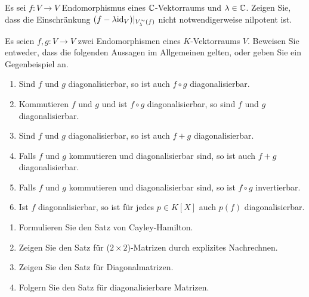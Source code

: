 \documentclass[a4paper,10pt]{scrartcl}
\begin{document}
\begin{question}
  Es sei $f \colon V \to V$ Endomorphismus eines $\mathbb{C}$-Vektorraums und $\lambda \in \mathbb{C}$.
  Zeigen Sie, dass die Einschränkung $(f - \lambda {\operatorname{id}_V})|_{V^\sim_\lambda(f)}$ nicht notwendigerweise nilpotent ist.
\end{question}


\begin{question}
  Es seien $f, g \colon V \to V$ zwei Endomorphismen eines $K$-Vektorraums $V$.
  Beweisen Sie entweder, dass die folgenden Aussagen im Allgemeinen gelten, oder geben Sie ein Gegenbeispiel an.
  \begin{enumerate}[leftmargin=*]
    \item
      Sind $f$ und $g$ diagonalisierbar, so ist auch $f \circ g$ diagonalisierbar.
    \item
      Kommutieren $f$ und $g$ und ist $f \circ g$ diagonalisierbar, so sind $f$ und $g$ diagonalisierbar.
    \item
      Sind $f$ und $g$ diagonalisierbar, so ist auch $f + g$ diagonalisierbar.
    \item
      Falls $f$ und $g$ kommutieren und diagonalisierbar sind, so ist auch $f + g$ diagonalisierbar.
    \item
      Falls $f$ und $g$ kommutieren und diagonalisierbar sind, so ist $f \circ g$ invertierbar.
    \item
      Ist $f$ diagonalisierbar, so ist für jedes $p \in K[X]$ auch $p(f)$ diagonalisierbar.
  \end{enumerate}
\end{question}


\begin{question}
  \begin{enumerate}[leftmargin=*]
    \item
      Formulieren Sie den Satz von Cayley-Hamilton.
    \item
      Zeigen Sie den Satz für ($2 \times 2$)-Matrizen durch explizites Nachrechnen.
    \item
      Zeigen Sie den Satz für Diagonalmatrizen.
    \item
      Folgern Sie den Satz für diagonalisierbare Matrizen.
  \end{enumerate}
\end{question}
\end{document}
